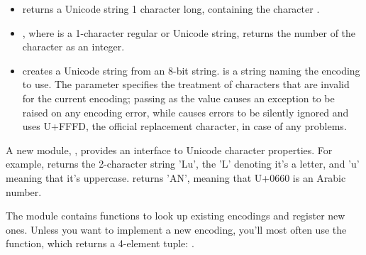 \documentclass{howto}
\begin{document}
\begin{itemize}
\item {} returns a Unicode string 1 character
long, containing the character .

\item {}, where  is a 1-character regular or Unicode string, returns the number of the character as an integer.

\item {} creates a Unicode string from an 8-bit
string.   is a string naming the encoding to use.
The  parameter specifies the treatment of characters that
are invalid for the current encoding; passing  as the
value causes an exception to be raised on any encoding error, while
 causes errors to be silently ignored and
 uses U+FFFD, the official replacement character, in
case of any problems.

\end{itemize}

A new module, , provides an interface to Unicode
character properties.  For example, 
returns the 2-character string 'Lu', the 'L' denoting it's a letter,
and 'u' meaning that it's uppercase.
 returns 'AN', meaning that U+0660 is
an Arabic number.

The  module contains functions to look up existing encodings
and register new ones.  Unless you want to implement a
new encoding, you'll most often use the
 function, which returns a
4-element tuple: .
\end{document}
